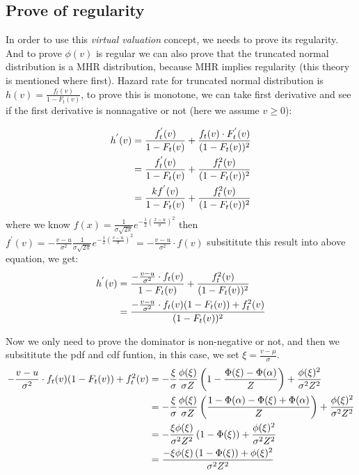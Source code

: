\subsection{Prove of regularity}
In order to use this \textit{virtual valuation} concept, we needs to prove its regularity. And to prove $\phi(v)$ is regular we can also prove that the truncated normal distribution is a MHR distribution, because MHR implies regularity (this theory is mentioned where first). Hazard rate for truncated normal distribution is $h(v) = \frac{f_t(v)}{1 - F_t(v)}$, to prove this is monotone, we can take first derivative and see if the first derivative is nonnagative or not (here we assume $v \geqslant 0$): 


\begin{equation}\notag
\begin{split}	
	h^{'}(v) &=\frac{f_t^{'}(v)}{1 - F_t(v)}  + \frac{f_t(v)\cdot F_t^{'} (v)}{(1 - F_t(v))^2}\\&= \frac{f_t^{'}(v)}{1 - F_t(v)}  + \frac{f_t^{2}(v)}{(1 - F_t(v))^2}\\&= \frac{kf^{'}(v)}{1 - F_t(v)}  + \frac{f_t^{2}(v)}{(1 - F_t(v))^2}
\end{split}
\end{equation} 
where we know $f(x) = \frac{1}{\sigma \sqrt{2\pi}} e^{-\frac{1}{2}(\frac{x-u}{\sigma})^2}$ then $f^{'}(v) = -\frac{v-u}{\sigma^2} \frac{1}{\sigma \sqrt{2\pi}} e^{-\frac{1}{2}(\frac{v-u}{\sigma})^2} = -\frac{v-u}{\sigma^2}\cdot f(v) $ subsititute this result into above equation, we get:
\begin{equation}\notag
\begin{split}	
h^{'}(v) &=\frac{-\frac{v-u}{\sigma^2}\cdot f_t(v)}{1 - F_t(v)}  + \frac{f_t^{2}(v)}{(1 - F_t(v))^2}\\&= \frac{-\frac{v-u}{\sigma^2}\cdot f_t(v)(1 - F_t(v)) + f_t^{2}(v)}{(1 - F_t(v))^2}
\end{split}
\end{equation} 

Now we only need to prove the dominator is non-negative or not, and then we subsititute the pdf and cdf funtion, in this case, we set $\xi = \frac{v-\mu}{\sigma}$.
\begin{equation}\notag
	\begin{split}	
		-\frac{v-u}{\sigma^2}\cdot f_t(v)(1 - F_t(v)) + f_t^{2}(v) &=-\frac{\xi}{\sigma}\frac{\phi(\xi)}{\sigma Z}\left(1 -  \frac{\Phi(\xi) - \Phi(\alpha)}{Z} \right) + \frac{\phi(\xi)^2}{\sigma^2 Z^2}\\&= -\frac{\xi}{\sigma}\frac{\phi(\xi)}{\sigma Z}\left( \frac{1 - \Phi(\alpha) - \Phi(\xi) + \Phi(\alpha)}{Z} \right) + \frac{\phi(\xi)^2}{\sigma^2 Z^2}\\&=-\frac{\xi\phi(\xi)}{\sigma^2 Z^2}\left( 1 - \Phi(\xi) \right)+ \frac{\phi(\xi)^2}{\sigma^2 Z^2}\\&=\frac{-\xi\phi(\xi)\left( 1 - \Phi(\xi) \right) + \phi(\xi)^2}{\sigma^2 Z^2} 
	\end{split}
\end{equation} 

